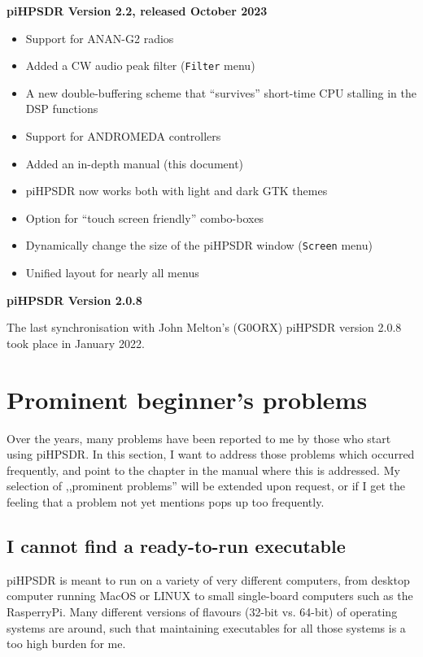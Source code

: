 \documentclass[12pt]{book}
\def\bltt#1{\texttt{\color{blue}#1}}
\def\pH{pi\-HPSDR\xspace}
\begin{document}
\medskip
\textbf{\pH Version 2.2, released October 2023}
\begin{itemize}
\item{Support for ANAN-G2 radios}
\item{Added a CW audio peak filter (\bltt{Filter} menu)}
\item{A new double-buffering scheme that ``survives'' short-time CPU stalling in the DSP functions}
\item{Support for ANDROMEDA controllers}
\item{Added an in-depth manual (this document)}
\item{\pH now works both with light and dark GTK themes}
\item{Option for ``touch screen friendly'' combo-boxes}
\item{Dynamically change the size  of the \pH window (\bltt{Screen} menu)}
\item{Unified layout for nearly all menus}
\end{itemize}

\medskip
\textbf{\pH Version 2.0.8}

\smallskip
The last synchronisation with John Melton's (G0ORX) \pH version 2.0.8 took place in January 2022.
\chapter{Prominent beginner's problems}
Over the years, many problems have been reported to me by those who start using \pH. In this
section, I want to address those problems which occurred frequently, and point to the
chapter in the manual where this is addressed. My selection of ,,prominent problems'' will
be extended upon request, or if I get the feeling that a problem not yet mentions pops up
too frequently.

\section{I cannot find a ready-to-run executable}
\pH is meant to run on a variety of very different computers, from desktop computer running
MacOS or LINUX to small single-board computers such as the RasperryPi. Many different versions
of flavours (32-bit vs. 64-bit) of operating systems are around, such that maintaining executables
for all those systems is a too high burden for me.
\end{document}
